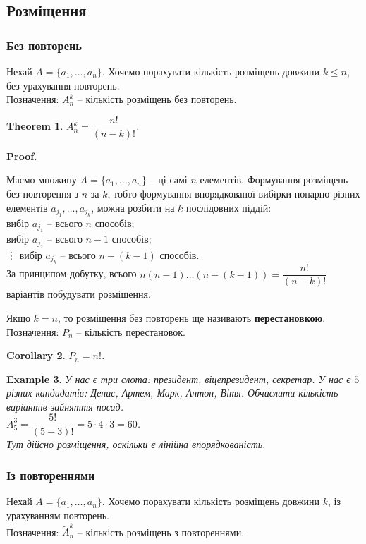 \documentclass[a4paper, 14pt]{extarticle}
\makeatletter
\theoremstyle{theoremdd}
\newtheorem{theorem}{Theorem}[subsection]
\theoremstyle{theoremdd}
\theoremstyle{theoremdd}
\theoremstyle{theoremdd}
\theoremstyle{theoremdd}
\newtheorem{example}[theorem]{Example}
\theoremstyle{theoremdd}
\theoremstyle{theoremdd}
\theoremstyle{theoremdd}
\theoremstyle{theoremdd}
\theoremstyle{theoremdd}
\theoremstyle{theoremdd}
\theoremstyle{theoremdd}
\theoremstyle{theoremdd}
\theoremstyle{theoremdd}
\newtheorem{corollary}[theorem]{Corollary}
\theoremstyle{theoremdd}
\renewenvironment{proof}[1][Proof.\\]{\par
\pushQED{\hfill \qed}%
\normalfont \topsep6\p@\@plus6\p@\relax
\trivlist
\item\relax
{\bfseries
#1\@addpunct{.}}\hspace\labelsep\ignorespaces
}{%
\popQED\endtrivlist\@endpefalse
}
\makeatother
\begin{document}
\subsection{Розміщення}
\subsubsection*{Без повторень}
Нехай $A = \{a_1,\dots,a_n\}$. Хочемо порахувати кількість розміщень довжини $k \leq n$, без урахування повторень.\\
Позначення: $A_n^k$ -- кількість розміщень без повторень.

\begin{theorem}
$A_n^k = \dfrac{n!}{(n-k)!}$.
\end{theorem}

\begin{proof}
Маємо множину $A = \{a_1,\dots,a_n\}$ -- ці самі $n$ елементів. Формування розміщень без повторення з $n$ за $k$, тобто формування впорядкованої вибірки попарно різних елементів $a_{j_1},\dots,a_{j_k}$, можна розбити на $k$ послідовних піддій: \\
вибір $a_{j_1}$ -- всього $n$ способів;\\
вибір $a_{j_2}$ -- всього $n-1$ способів;\\
\vdots
вибір $a_{j_k}$ -- всього $n-(k-1)$ способів.\\
За принципом добутку, всього $n (n-1) \dots (n-(k-1)) = \dfrac{n!}{(n-k)!}$ варіантів побудувати розміщення.
\end{proof}

Якщо $k = n$, то розміщення без повторень ще називають \textbf{перестановкою}. \\
Позначення: $P_n$ -- кількість перестановок.

\begin{corollary}
$P_n = n!$.
\end{corollary}

\begin{example}
У нас є три слота: президент, віцепрезидент, секретар. У нас є $5$ різних кандидатів: Денис, Артем, Марк, Антон, Вітя. Обчислити кількість варіантів зайняття посад.\\
$A_5^3 = \dfrac{5!}{(5-3)!} = 5 \cdot 4 \cdot 3 = 60$.
\bigskip \\
Тут дійсно розміщення, оскільки є лінійна впорядкованість.
\end{example}

\subsubsection*{Із повтореннями}
Нехай $A = \{a_1,\dots,a_n\}$. Хочемо порахувати кількість розміщень довжини $k$, із урахуванням повторень.\\
Позначення: $\tilde{A}_n^k$ -- кількість розміщень з повтореннями.
\end{document}
